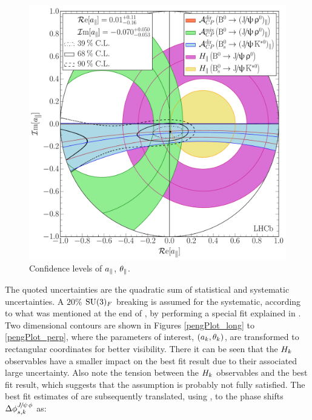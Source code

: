 \begin{figure}[t]
\centering
  \includegraphics[trim=0.0cm 0.0cm 0.0cm 0.0cm, clip=true,scale=0.39]{Figures/Chapter5/Penguin_Contribution_Re_vs_Im_allB2VV_Para_withH.pdf}
  \caption{Confidence levels of $a_{\parallel}$, $\theta_{\parallel}$.}
  \label{pengPlot_para}
\end{figure}

\noindent The quoted uncertainties are the quadratic sum of statistical and systematic uncertainties.
A $20\%$ $\mathrm{SU}(3)_F$ breaking is assumed for the systematic, according to what was mentioned at
the end of , by performing a special fit explained in .
Two dimensional contours are shown in Figures \ref{pengPlot_long} to \ref{pengPlot_perp}, where the
parameters of interest, $(a_k,\theta_k)$, are transformed to rectangular coordinates for better
visibility. There it can be seen that the $H_{k}$ observables have a smaller impact on the best fit
result due to their associated large uncertainty. Also note the tension between the $H_{k}$ observables
and the best fit result, which suggests that the assumption  is probably
not fully satisfied. The best fit estimates of  are subsequently translated,
using , to the phase shifts $\Delta\phi^{{J\mskip -3mu/\mskip -2mu\psi\mskip 2mu}\phi}_{s,{k}}$ as:

